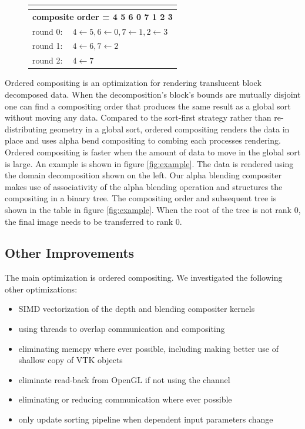 \documentclass[a4paper,10pt]{report}
\begin{document}
\begin{figure}
\begin{minipage}{0.3\textwidth}
{\footnotesize
\def\arraystretch{1.25}
\begin{tabular}{|ll|}
\multicolumn{2}{c}{} \\ \hline
\multicolumn{2}{|c|}{\bf composite order = 4 5 6 0 7 1 2 3} \\ \hline
round 0: & $4 \leftarrow 5, 6 \leftarrow 0, 7 \leftarrow 1, 2 \leftarrow 3$  \\
round 1: & $4 \leftarrow 6, 7 \leftarrow 2$  \\
round 2: & $4 \leftarrow 7$ \\ \hline
\end{tabular}}
\end{minipage}
\end{figure}

Ordered compositing is an optimization for rendering translucent block decomposed data. When the decomposition's block's bounds are mutually disjoint one can find a compositing order that produces the same result as a global sort without moving any data. Compared to the sort-first strategy rather than re-distributing geometry in a global sort, ordered compositing renders the data in place and uses alpha bend compositing to combing each processes rendering. Ordered compositing is faster when the amount of data to move in the global sort is large. An example is shown in figure \ref{fig:example}. The data is rendered using the domain decomposition shown on the left. Our alpha blending compositer makes use of associativity of the alpha blending operation and structures the compositing in a binary tree. The compositing order and subsequent tree is shown in the table in figure \ref{fig:example}. When the root of the tree is not rank 0, the final image needs to be transferred to rank 0.

\subsection*{Other Improvements}
The main optimization is ordered compositing. We investigated the following other optimizations:
\begin{itemize}
 \item SIMD vectorization of the depth and blending compositer kernels
 \item using threads to overlap communication and compositing
 \item eliminating memcpy where ever possible, including making better use of shallow copy of VTK objects
 \item eliminate read-back from OpenGL if not using the channel
 \item eliminating or reducing communication where ever possible
 \item only update sorting pipeline when dependent input parameters change
\end{itemize}
\end{document}

